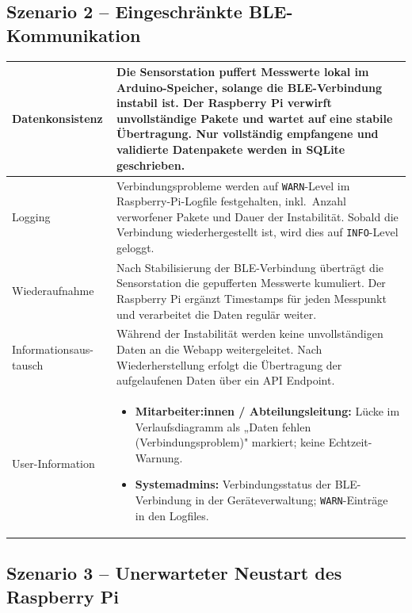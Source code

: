 \documentclass[12pt,a4paper]{article}
\begin{document}
    \subsection{Szenario 2 – Eingeschränkte BLE-Kommunikation}

    \begin{tabularx}{\linewidth}{L X}
    \toprule
    Datenkonsistenz &
    Die Sensorstation puffert Messwerte lokal im Arduino-Speicher, solange die BLE-Verbindung
    instabil ist. Der Raspberry Pi verwirft unvollständige Pakete und wartet auf eine stabile Übertragung.
    Nur vollständig empfangene und validierte Datenpakete werden in SQLite geschrieben. \\
    \midrule
    Logging &
    Verbindungsprobleme werden auf \texttt{WARN}-Level im Raspberry-Pi-Logfile festgehalten,
    inkl.\ Anzahl verworfener Pakete und Dauer der Instabilität.
    Sobald die Verbindung wiederhergestellt ist, wird dies auf \texttt{INFO}-Level geloggt. \\
    \midrule
    Wiederaufnahme &
    Nach Stabilisierung der BLE-Verbindung überträgt die Sensorstation die gepufferten
    Messwerte kumuliert. Der Raspberry Pi ergänzt Timestamps für jeden Messpunkt
    und verarbeitet die Daten regulär weiter. \\
    \midrule
    Informationsaus-
    tausch &
    Während der Instabilität werden keine unvollständigen Daten an die Webapp weitergeleitet.
    Nach Wiederherstellung erfolgt die Übertragung der aufgelaufenen Daten über ein API Endpoint. \\
    \midrule
    User-Information &
    \begin{minipage}[t]{\linewidth}
        \begin{itemize}[leftmargin=1.2em, itemsep=2pt, topsep=0pt]
            \item \textbf{Mitarbeiter:innen / Abteilungsleitung:} Lücke im Verlaufsdiagramm
            als „Daten fehlen (Verbindungsproblem)" markiert; keine Echtzeit-Warnung.
            \item \textbf{Systemadmins:} Verbindungsstatus der BLE-Verbindung in der
            Geräteverwaltung; \texttt{WARN}-Einträge in den Logfiles.
        \end{itemize}
    \end{minipage} \\
    \bottomrule
    \end{tabularx}


    \subsection{Szenario 3 – Unerwarteter Neustart des Raspberry Pi}
\end{document}
